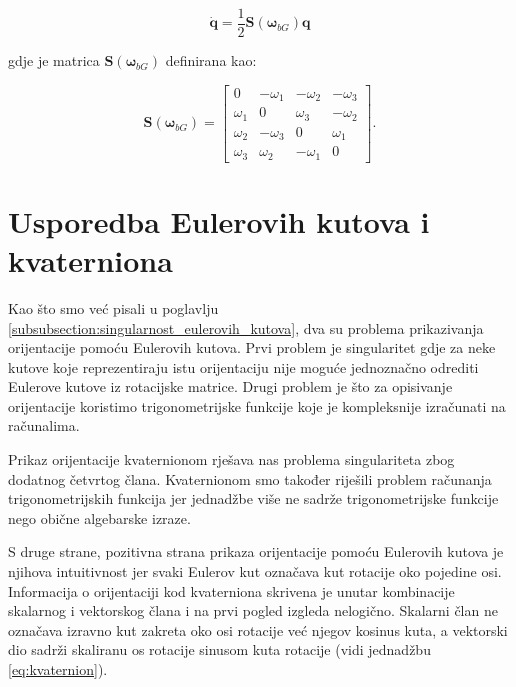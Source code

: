 \documentclass[times, utf8, diplomski, numeric]{templates/template}
\begin{document}
{{{            \begin{equation}
            \label{eq:rot_qib_elem}
                \dot{\boldsymbol{q}} = \frac{1}{2} \boldsymbol{S}(\boldsymbol{\omega}_{bG}) \boldsymbol{q}
            \end{equation}

            gdje je matrica $\boldsymbol{S}(\boldsymbol{\omega}_{bG})$ definirana kao:

            \begin{equation}
                \boldsymbol{S}(\boldsymbol{\omega}_{bG}) =
                \begin{bmatrix}
                    0        & -\omega_1    & -\omega_2 & -\omega_3 \\
                    \omega_1 &     0        & \omega_3  & -\omega_2 \\
                    \omega_2 & -\omega_3    &    0      & \omega_1 \\
                    \omega_3 & \omega_2     & -\omega_1 &     0 
                \end{bmatrix}
                .
            \end{equation}
        }
    }

    \section{Usporedba Eulerovih kutova i kvaterniona}{
        Kao što smo već pisali u poglavlju \ref{subsubsection:singularnost_eulerovih_kutova}, dva su problema prikazivanja orijentacije pomoću Eulerovih kutova. Prvi problem je singularitet gdje za neke kutove koje reprezentiraju istu orijentaciju nije moguće jednoznačno odrediti Eulerove kutove iz rotacijske matrice. Drugi problem je što za opisivanje orijentacije koristimo trigonometrijske funkcije koje je kompleksnije izračunati na računalima.

        Prikaz orijentacije kvaternionom rješava nas problema singulariteta zbog dodatnog četvrtog člana. Kvaternionom smo također riješili problem računanja trigonometrijskih funkcija jer jednadžbe više ne sadrže trigonometrijske funkcije nego obične algebarske izraze.

        S druge strane, pozitivna strana prikaza orijentacije pomoću Eulerovih kutova je njihova intuitivnost jer svaki Eulerov kut označava kut rotacije oko pojedine osi. Informacija o orijentaciji kod kvaterniona skrivena je unutar kombinacije skalarnog i vektorskog člana i na prvi pogled izgleda nelogično. Skalarni član ne označava izravno kut zakreta oko osi rotacije već njegov kosinus kuta, a vektorski dio sadrži skaliranu os rotacije sinusom kuta rotacije (vidi jednadžbu \ref{eq:kvaternion}).
    }

}
\end{document}
